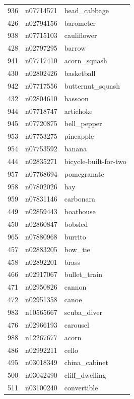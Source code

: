 \begin{table}
\begin{tabular}{cll}
936 & n07714571 & head_cabbage \\
426 & n02794156 & barometer \\
938 & n07715103 & cauliflower \\
428 & n02797295 & barrow \\
941 & n07717410 & acorn_squash \\
430 & n02802426 & basketball \\
942 & n07717556 & butternut_squash \\
432 & n02804610 & bassoon \\
944 & n07718747 & artichoke \\
945 & n07720875 & bell_pepper \\
953 & n07753275 & pineapple \\
954 & n07753592 & banana \\
444 & n02835271 & bicycle-built-for-two \\
957 & n07768694 & pomegranate \\
958 & n07802026 & hay \\
959 & n07831146 & carbonara \\
449 & n02859443 & boathouse \\
450 & n02860847 & bobsled \\
965 & n07880968 & burrito \\
457 & n02883205 & bow_tie \\
458 & n02892201 & brass \\
466 & n02917067 & bullet_train \\
471 & n02950826 & cannon \\
472 & n02951358 & canoe \\
983 & n10565667 & scuba_diver \\
476 & n02966193 & carousel \\
988 & n12267677 & acorn \\
486 & n02992211 & cello \\
495 & n03018349 & china_cabinet \\
500 & n03042490 & cliff_dwelling \\
511 & n03100240 & convertible \\
\bottomrule
\end{tabular}
\end{table}
